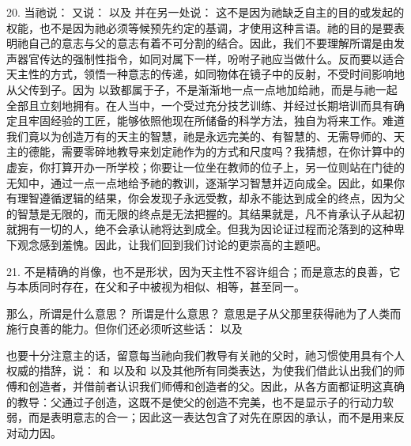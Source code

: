 20. 当祂说： 又说： 以及 并在另一处说： 这不是因为祂缺乏自主的目的或发起的权能，也不是因为祂必须等候预先约定的基调，才使用这种言语。祂的目的是要表明祂自己的意志与父的意志有着不可分割的结合。因此，我们不要理解所谓是由发声器官传达的强制性指令，如同对属下一样，吩咐子祂应当做什么。反而要以适合天主性的方式，领悟一种意志的传递，如同物体在镜子中的反射，不受时间影响地从父传到子。因为 以致都属于子，不是渐渐地一点一点地加给祂，而是与祂一起全部且立刻地拥有。在人当中，一个受过充分技艺训练、并经过长期培训而具有确定且牢固经验的工匠，能够依照他现在所储备的科学方法，独自为将来工作。难道我们竟以为创造万有的天主的智慧，祂是永远完美的、有智慧的、无需导师的、天主的德能，需要零碎地教导来划定祂作为的方式和尺度吗？我猜想，在你计算中的虚妄，你打算开办一所学校；你要让一位坐在教师的位子上，另一位则站在门徒的无知中，通过一点一点地给予祂的教训，逐渐学习智慧并迈向成全。因此，如果你有理智遵循逻辑的结果，你会发现子永远受教，却永不能达到成全的终点，因为父的智慧是无限的，而无限的终点是无法把握的。其结果就是，凡不肯承认子从起初就拥有一切的人，绝不会承认祂将达到成全。但我为因论证过程而沦落到的这种卑下观念感到羞愧。因此，让我们回到我们讨论的更崇高的主题吧。\par

21.  不是精确的肖像，也不是形状，因为天主性不容许组合；而是意志的良善，它与本质同时存在，在父和子中被视为相似、相等，甚至同一。\par

那么，所谓是什么意思？ 所谓是什么意思？ 意思是子从父那里获得祂为了人类而施行良善的能力。但你们还必须听这些话： 以及\par

也要十分注意主的话，留意每当祂向我们教导有关祂的父时，祂习惯使用具有个人权威的措辞，说： 和 以及和 以及其他所有同类表达，为使我们借此认出我们的师傅和创造者，并借前者认识我们师傅和创造者的父。因此，从各方面都证明这真确的教导：父通过子创造，这既不是使父的创造不完美，也不是显示子的行动力软弱，而是表明意志的合一；因此这一表达包含了对先在原因的承认，而不是用来反对动力因。\par

